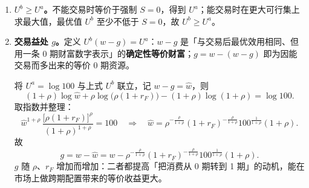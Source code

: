 \begin{solution}
\begin{enumerate}[label=(\alph*)]
    \item \textbf{$U^{b}\ge U^{a}$。}不能交易时等价于强制 $S=0$，得到 $U^{a}$；能交易时在更大可行集上求最大值，最优值 $U^{b}$ 至少不低于 $S=0$，故 $U^{b}\ge U^{a}$。

    \item \textbf{交易益处 $g$。}定义 $U^{b}(w-g)=U^{a}$：$w-g$ 是「与交易后最优效用相同、但用一条 0 期财富数字表示」的\textbf{确定性等价财富}；$g=w-(w-g)$ 即为因能交易而多出来的等价 0 期资源。

    将 $U^{a}=\log 100$ 与上式 $U^{b}$ 联立，记 $w-g=\hat w$，则
    \[
        (1+\rho)\log\hat w+\rho\log\bigl(\rho(1+r_F)\bigr)-(1+\rho)\log(1+\rho)=\log 100.
    \]
    取指数并整理：
    \[
        \hat w^{1+\rho}\,\frac{\bigl[\rho(1+r_F)\bigr]^{\rho}}{(1+\rho)^{1+\rho}}=100
        \quad\Rightarrow\quad
        \hat w=\rho^{-\frac{\rho}{1+\rho}}(1+r_F)^{-\frac{\rho}{1+\rho}}
        100^{\frac{1}{1+\rho}}(1+\rho).
    \]
    故
    \[
        g=w-\hat w
        =w-\rho^{-\frac{\rho}{1+\rho}}(1+r_F)^{-\frac{\rho}{1+\rho}}
        100^{\frac{1}{1+\rho}}(1+\rho).
    \]
    $g$ 随 $\rho$、$r_F$ 增加而增加：二者都提高「把消费从 0 期转到 1 期」的动机，能在市场上做跨期配置带来的等价收益更大。
\end{enumerate}
\end{solution}

